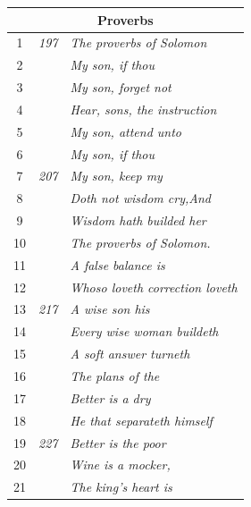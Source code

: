 \documentclass{article}
\newlength{\minipageheight}
\newlength{\minipagewidth}
\begin{document}
\begin{minipage}[r][\minipageheight][t]{\minipagewidth}
\begin{longtable}{ccl}
        \multicolumn{3}{c}{\textbf{Proverbs}}                                   \\
        \hline
        1           & \textit{197} & \textit{The proverbs of Solomon}           \\
        2           &              & \textit{My son, if thou}                   \\
        3           &              & \textit{My son, forget not}                \\
        4           &              & \textit{Hear, sons, the instruction}       \\
        5           &              & \textit{My son, attend unto}               \\
        6           &              & \textit{My son, if thou}                   \\
        7           & \textit{207} & \textit{My son, keep my}                   \\
        8           &              & \textit{Doth not wisdom cry,And}           \\
        9           &              & \textit{Wisdom hath builded her}           \\
        10          &              & \textit{The proverbs of Solomon.}          \\
        11          &              & \textit{A false balance is}                \\
        12          &              & \textit{Whoso loveth correction loveth}    \\
        13          & \textit{217} & \textit{A wise son his}                    \\
        14          &              & \textit{Every wise woman buildeth}         \\
        15          &              & \textit{A soft answer turneth}             \\
        16          &              & \textit{The plans of the}                  \\
        17          &              & \textit{Better is a dry}                   \\
        18          &              & \textit{He that separateth himself}        \\
        19          & \textit{227} & \textit{Better is the poor}                \\
        20          &              & \textit{Wine is a mocker,}                 \\
        21          &              & \textit{The king’s heart is}               \\

\end{longtable}
\end{minipage}
\end{document}
